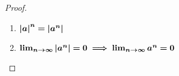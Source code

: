 \documentclass[MathsNotesBase.tex]{subfiles}
\begin{document}
{\begin{proof}
\begin{enumerate}
{				\[ x_{n+1} = x_n \cdot x = \abs{a}^n\abs{a} < \abs{a}^n = x_n \]
				so that $x_n$ is a decreasing sequence. Additionally, ${ \forall n \in \R{} \logicsep \abs{a}^n \geq 0 }$ so 0 is a lower bound on the sequence. Therefore, the sequence converges to a limit (note we haven't yet established that 0 is the limit - only that it is a candidate). Furthermore, ${ x_{n+1} = \abs{a}^{n+1} = \abs{a}^n\abs{a} }$ and, if ${ x_n \to L }$ then ${ x_{n+1} \to L }$ also. But, putting these two facts together, along with property (d) of limits of sequences, means that,
				\[ L = \lim_{n \to \infty} \abs{a}^{n+1} = \lim_{n \to \infty} \abs{a}^n\abs{a} = (\lim_{n \to \infty} \abs{a}^n)(\lim_{n \to \infty} \abs{a}) = \abs{a}(\lim_{n \to \infty} \abs{a}^n) = \abs{a}L. \]
				So,
				\[ L = \abs{a}L \iff L(1 - \abs{a}) = 0 \]
				and, since we know that ${ \abs{a} \neq 1 }$, therefore $L$ must be 0.
			}
			
			\item{${\bm{ \left\lvert a\right\rvert^n = \left\lvert a^n\right\rvert }}$}\label{geom_prog_common_ratio_less_than_one_tends_to_zero_2}
			
			\item{${\bm{ \lim_{n \to \infty} \left\lvert a^n\right\rvert = 0 \implies \lim_{n \to \infty} a^n = 0 }}$}
			\end{enumerate}
								

\end{proof}}
\end{document}
